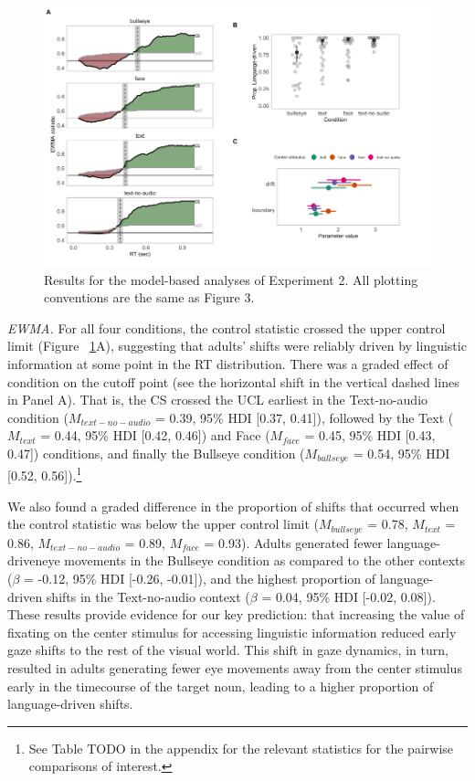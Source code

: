 \documentclass[english,floatsintext,man]{apa6}
\begin{document}
\begin{figure}[!t]

{\centering \includegraphics[width=0.9\linewidth]{figs/text-model-plots-1} 

}

\caption{Results for the model-based analyses of Experiment 2. All plotting conventions are the same as Figure 3.}\label{fig:text-model-plots}
\end{figure}

\emph{EWMA.} For all four conditions, the control statistic crossed the
upper control limit (Figure ~\ref{fig:text-model-plots}A), suggesting
that adults' shifts were reliably driven by linguistic information at
some point in the RT distribution. There was a graded effect of
condition on the cutoff point (see the horizontal shift in the vertical
dashed lines in Panel A). That is, the CS crossed the UCL earliest in
the Text-no-audio condition (\(M_{text-no-audio}\) = 0.39, 95\% HDI
{[}0.37, 0.41{]}), followed by the Text (\(M_{text}\) = 0.44, 95\% HDI
{[}0.42, 0.46{]}) and Face (\(M_{face}\) = 0.45, 95\% HDI {[}0.43,
0.47{]}) conditions, and finally the Bullseye condition
(\(M_{bullseye}\) = 0.54, 95\% HDI {[}0.52, 0.56{]}).\footnote{See Table
  TODO in the appendix for the relevant statistics for the pairwise
  comparisons of interest.}

We also found a graded difference in the proportion of shifts that
occurred when the control statistic was below the upper control limit
(\(M_{bullseye}\) = 0.78, \(M_{text}\) = 0.86, \(M_{text-no-audio}\) =
0.89, \(M_{face}\) = 0.93). Adults generated fewer language-driveneye
movements in the Bullseye condition as compared to the other contexts
(\(\beta\) = -0.12, 95\% HDI {[}-0.26, -0.01{]}), and the highest
proportion of language-driven shifts in the Text-no-audio context
(\(\beta\) = 0.04, 95\% HDI {[}-0.02, 0.08{]}). These results provide
evidence for our key prediction: that increasing the value of fixating
on the center stimulus for accessing linguistic information reduced
early gaze shifts to the rest of the visual world. This shift in gaze
dynamics, in turn, resulted in adults generating fewer eye movements
away from the center stimulus early in the timecourse of the target
noun, leading to a higher proportion of language-driven shifts.
\end{document}
